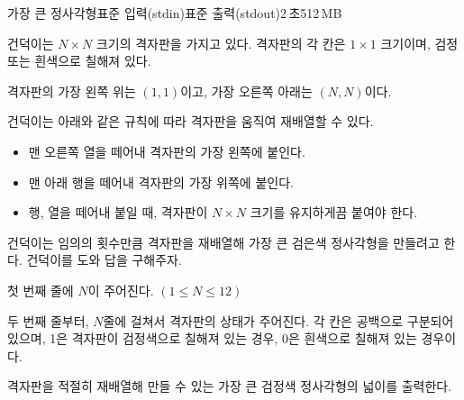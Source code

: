 \begin{problem}{가장 큰 정사각형}{표준 입력(stdin)}{표준 출력(stdout)}{2\,초}{512\,MB}

건덕이는 $N \times N$ 크기의 격자판을 가지고 있다. 격자판의 각 칸은 $1 \times 1$ 크기이며, 검정 또는 흰색으로 칠해져 있다.

격자판의 가장 왼쪽 위는 $(1, 1)$이고, 가장 오른쪽 아래는 $(N, N)$이다.

건덕이는 아래와 같은 규칙에 따라 격자판을 움직여 재배열할 수 있다.

\begin{itemize}
  \item 맨 오른쪽 열을 떼어내 격자판의 가장 왼쪽에 붙인다.
  \item 맨 아래 행을 떼어내 격자판의 가장 위쪽에 붙인다.
  \item 행, 열을 떼어내 붙일 때, 격자판이 $N \times N$ 크기를 유지하게끔 붙여야 한다.
\end{itemize}

건덕이는 임의의 횟수만큼 격자판을 재배열해 가장 큰 검은색 정사각형을 만들려고 한다. 건덕이를 도와 답을 구해주자.

\InputFile
첫 번째 줄에 $N$이 주어진다. $(1 \leq N \leq 12)$

두 번째 줄부터, $N$줄에 걸쳐서 격자판의 상태가 주어진다. 각 칸은 공백으로 구분되어 있으며, 1은 격자판이 검정색으로 칠해져 있는 경우, 0은 흰색으로 칠해져 있는 경우이다.

\OutputFile
격자판을 적절히 재배열해 만들 수 있는 가장 큰 검정색 정사각형의 넓이를 출력한다.

\Examples

\begin{example}
%
%
\end{example}


\end{problem}
